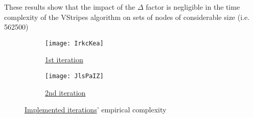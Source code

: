 These results show that the impact of the $\Delta$ factor is negligible in the time complexity of the VStripes algorithm on sets of nodes of considerable size (i.e. 562500)

\begin{figure}[H]
    \centering
    \begin{subfigure}{0.49\textwidth}
        \centering
        \texttt{[image: IrkcKea]}
        \caption{\hyperref[iterations-1]{1st iteration}}
    \end{subfigure}
    \begin{subfigure}{0.49\textwidth}
        \centering
        \texttt{[image: JlsPaIZ]}
        \caption{\hyperref[iterations-2]{2nd iteration}}
    \end{subfigure}
    \caption{\hyperref[iterations]{Implemented iterations}' empirical complexity}
\end{figure}
